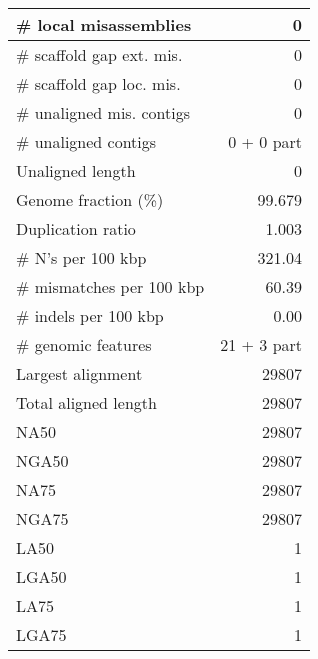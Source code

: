 \documentclass[12pt,a4paper]{article}
\begin{document}
\begin{table}[ht]
\begin{center}
\begin{tabular}{|l*{1}{|r}|}
\# local misassemblies & 0 \\ \hline
\# scaffold gap ext. mis. & 0 \\ \hline
\# scaffold gap loc. mis. & 0 \\ \hline
\# unaligned mis. contigs & 0 \\ \hline
\# unaligned contigs & 0 + 0 part \\ \hline
Unaligned length & 0 \\ \hline
Genome fraction (\%) & 99.679 \\ \hline
Duplication ratio & 1.003 \\ \hline
\# N's per 100 kbp & 321.04 \\ \hline
\# mismatches per 100 kbp & 60.39 \\ \hline
\# indels per 100 kbp & 0.00 \\ \hline
\# genomic features & 21 + 3 part \\ \hline
Largest alignment & 29807 \\ \hline
Total aligned length & 29807 \\ \hline
NA50 & 29807 \\ \hline
NGA50 & 29807 \\ \hline
NA75 & 29807 \\ \hline
NGA75 & 29807 \\ \hline
LA50 & 1 \\ \hline
LGA50 & 1 \\ \hline
LA75 & 1 \\ \hline
LGA75 & 1 \\ \hline
\end{tabular}
\end{center}
\end{table}
\end{document}
